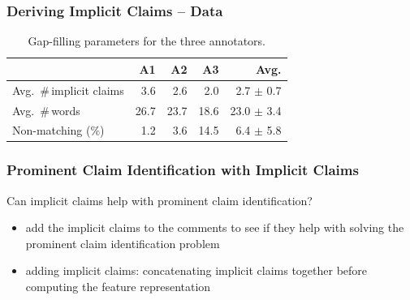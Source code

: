 \documentclass{beamer}
\begin{document}
\begin{frame}
	\frametitle{Deriving Implicit Claims -- Data}
\begin{table}[t]
{\small
\begin{center}
\begin{tabular}{lrrrr}
\toprule
& A1 & A2 & A3 & Avg.\\
\midrule
Avg.~\#\,implicit claims  & 3.6  & 2.6   & 2.0   &  \phantom{0}2.7 $\pm$ 0.7  \\
Avg.~\#\,words     & 26.7 & 23.7  & 18.6  &  23.0 $\pm$ 3.4      \\
Non-matching (\%)     & 1.2  & 3.6   & 14.5  &  \phantom{0}6.4 $\pm$ 5.8  \\
\bottomrule
\end{tabular}
\caption{Gap-filling parameters for the three annotators.}
\label{tab:var-annotators}
\end{center}}
\end{table}

\end{frame}

\begin{frame}
	\frametitle{Prominent Claim Identification with Implicit Claims}

	Can implicit claims help with prominent claim identification?
	\begin{itemize}
		\item add the implicit claims to the comments to see if they help
			with solving the prominent claim identification problem

		\item adding implicit claims: concatenating implicit claims
			together before computing the feature representation
	\end{itemize}

\end{frame}
\end{document}
